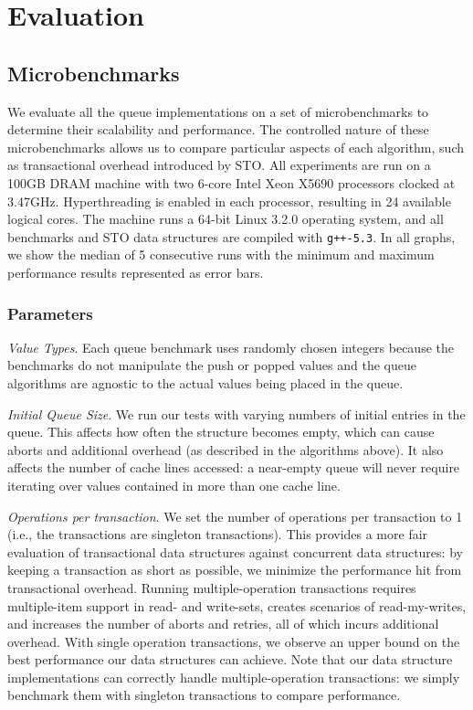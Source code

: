 \section{Evaluation}

\subsection{Microbenchmarks}
\label{q_microbenchmarks}

We evaluate all the queue implementations on a set of microbenchmarks to determine their scalability and performance. The controlled nature of these microbenchmarks allows us to compare particular aspects of each algorithm, such as transactional overhead introduced by STO. All experiments are run on a 100GB DRAM machine with two 6-core Intel Xeon X5690 processors clocked at 3.47GHz. Hyperthreading is enabled in each processor, resulting in 24 available logical cores. The machine runs a 64-bit Linux 3.2.0 operating system, and all benchmarks and STO data structures are compiled with \texttt{g++-5.3}. In all graphs, we show the median of 5 consecutive runs with the minimum and maximum performance results represented as error bars.

\subsubsection{Parameters}

\emph{Value Types}. Each queue benchmark uses randomly chosen integers because the benchmarks do not manipulate the push or popped values and the queue algorithms are agnostic to the actual values being placed in the queue.

\emph{Initial Queue Size}. We run our tests with varying numbers of initial entries in the queue. This affects how often the structure becomes empty, which can cause aborts and additional overhead (as described in the algorithms above). It also affects the number of cache lines accessed: a near-empty queue will never require iterating over values contained in more than one cache line.

\emph{Operations per transaction}. We set the number of operations per transaction to 1 (i.e., the transactions are singleton transactions). This provides a more fair evaluation of transactional data structures against concurrent data structures: by keeping a transaction as short as possible, we minimize the performance hit from transactional overhead. Running multiple-operation transactions requires multiple-item support in read- and write-sets, creates scenarios of read-my-writes, and increases the number of aborts and retries, all of which incurs additional overhead. With single operation transactions, we observe an upper bound on the best performance our data structures can achieve. Note that our data structure implementations can correctly handle multiple-operation transactions: we simply benchmark them with singleton transactions to compare performance.

